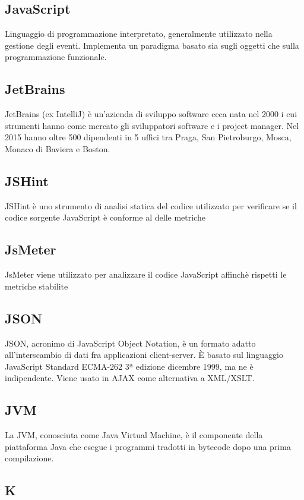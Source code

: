 \subsection{JavaScript}
Linguaggio di programmazione interpretato, generalmente utilizzato nella gestione
degli eventi. Implementa un paradigma basato sia sugli oggetti che sulla programmazione
funzionale.

\subsection{JetBrains}
JetBrains (ex IntelliJ) è un'azienda di sviluppo software ceca nata nel 2000 i cui strumenti hanno come mercato gli sviluppatori software e i project manager. Nel 2015 hanno oltre 500 dipendenti in 5 uffici tra Praga, San Pietroburgo, Mosca, Monaco di Baviera e Boston.

\subsection{JSHint}
JSHint è uno strumento di analisi statica del codice utilizzato per verificare se il codice sorgente
JavaScript è conforme al delle metriche

\subsection{JsMeter}
JsMeter viene utilizzato per analizzare il codice JavaScript affinchè rispetti le metriche stabilite

\subsection{JSON}
JSON, acronimo di JavaScript Object Notation, è un formato adatto all'interscambio di dati fra applicazioni client-server. È basato sul linguaggio JavaScript Standard ECMA-262 3ª edizione dicembre 1999, ma ne è indipendente. Viene usato in AJAX come alternativa a XML/XSLT.

\subsection{JVM}
La JVM, conosciuta come Java Virtual Machine, è il componente della piattaforma Java che esegue i programmi tradotti in bytecode dopo una prima compilazione.

\newpage

\begin{center}
\Huge\section{\uppercase{K}}
\end{center}

